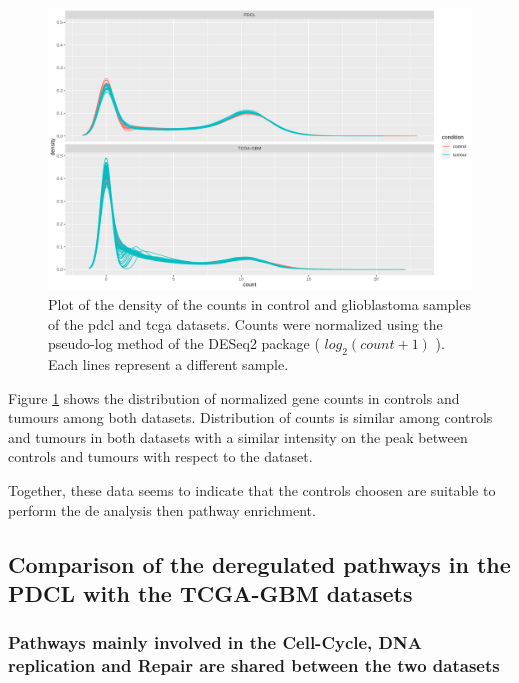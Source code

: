 \begin{figure}
    \includegraphics[width=\textwidth]{img/density_plot}
    \caption{
        Plot of the density of the counts in control and glioblastoma samples of the \acrshort{pdcl} and \acrshort{tcga} datasets.
        Counts were normalized using the pseudo-log method of the DESeq2 package ( $log_2(count+1)$ ).
        Each lines represent a different sample.
    }
    \label{fig:density-plot}
\end{figure}

Figure \ref*{fig:density-plot} shows the distribution of normalized gene counts in controls and tumours among both datasets.
Distribution of counts is similar among controls and tumours in both datasets with a similar intensity on the peak between controls and tumours with respect to the dataset.

Together, these data seems to indicate that the controls choosen are suitable to perform the \acrlong{de} analysis then pathway enrichment.

\subsection{Comparison of the deregulated pathways in the PDCL with the TCGA-GBM datasets}

\subsubsection{Pathways mainly involved in the Cell-Cycle, DNA replication and Repair are shared between the two datasets}

